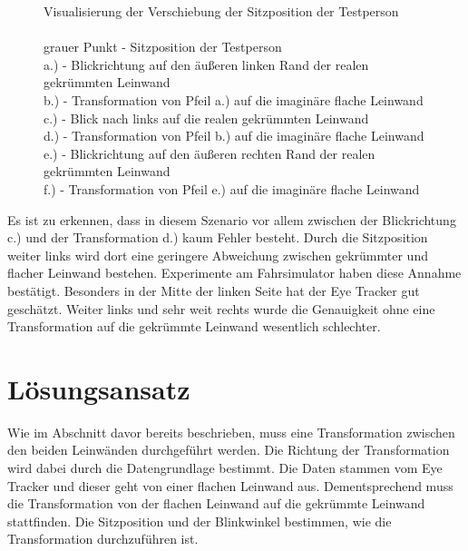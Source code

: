 \begin{figure}
\begin{center}
		\caption{Visualisierung der Verschiebung der Sitzposition der Testperson\\\\
		\footnotesize grauer Punkt - Sitzposition der Testperson\\
		a.) - Blickrichtung auf den äußeren linken Rand der realen gekrümmten Leinwand\\
		b.) - Transformation von Pfeil a.) auf die imaginäre flache Leinwand\\
		c.) - Blick nach links auf die realen gekrümmten Leinwand\\
		d.) - Transformation von Pfeil b.) auf die imaginäre flache Leinwand\\
		e.) - Blickrichtung auf den äußeren rechten Rand der realen gekrümmten Leinwand\\
		f.) - Transformation von Pfeil e.) auf die imaginäre flache Leinwand} \label{fig:kruemmungsproblem_3}
	\end{center}
\end{figure}

Es ist zu erkennen, dass in diesem Szenario vor allem zwischen der Blickrichtung c.) und der Transformation d.) kaum Fehler besteht. Durch die Sitzposition weiter links wird dort eine geringere Abweichung zwischen gekrümmter und flacher Leinwand bestehen. Experimente am Fahrsimulator haben diese Annahme bestätigt. Besonders in der Mitte der linken Seite hat der Eye Tracker gut geschätzt. Weiter links und sehr weit rechts wurde die Genauigkeit ohne eine Transformation auf die gekrümmte Leinwand wesentlich schlechter. 



\section{Lösungsansatz}

Wie im Abschnitt davor bereits beschrieben, muss eine Transformation zwischen den beiden Leinwänden durchgeführt werden. Die Richtung der Transformation wird dabei durch die Datengrundlage bestimmt. Die Daten stammen vom Eye Tracker und dieser geht von einer flachen Leinwand aus. Dementsprechend muss die Transformation von der flachen Leinwand auf die gekrümmte Leinwand stattfinden. 
Die Sitzposition und der Blinkwinkel bestimmen, wie die Transformation durchzuführen ist. 

